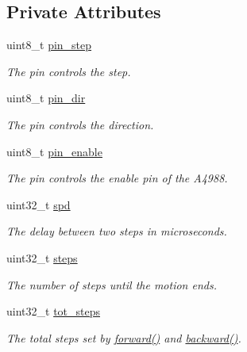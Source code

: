 \subsection*{Private Attributes}
\begin{DoxyCompactItemize}
\item 
uint8\+\_\+t \hyperlink{class_m_s_m_c___a4988_a2ea61398ce88d1ee627b409a5965b478}{pin\+\_\+step}
\begin{DoxyCompactList}\small\item\em The pin controls the step. \end{DoxyCompactList}\item 
uint8\+\_\+t \hyperlink{class_m_s_m_c___a4988_a2bc9676a272bcd6604aaf8b08ac07109}{pin\+\_\+dir}
\begin{DoxyCompactList}\small\item\em The pin controls the direction. \end{DoxyCompactList}\item 
uint8\+\_\+t \hyperlink{class_m_s_m_c___a4988_a822c3db98367f3e60347a13d1d16170b}{pin\+\_\+enable}
\begin{DoxyCompactList}\small\item\em The pin controls the enable pin of the A4988. \end{DoxyCompactList}\item 
uint32\+\_\+t \hyperlink{class_m_s_m_c___a4988_a6453efb52d22739962c05b0d03f65aa7}{spd}
\begin{DoxyCompactList}\small\item\em The delay between two steps in microseconds. \end{DoxyCompactList}\item 
uint32\+\_\+t \hyperlink{class_m_s_m_c___a4988_aa85fc95facc940db652cd2f545f033cd}{steps}
\begin{DoxyCompactList}\small\item\em The number of steps until the motion ends. \end{DoxyCompactList}\item 
uint32\+\_\+t \hyperlink{class_m_s_m_c___a4988_aa7de83eb15a9f82533b898146921939b}{tot\+\_\+steps}
\begin{DoxyCompactList}\small\item\em The total steps set by \hyperlink{class_m_s_m_c___a4988_a9acdbabf546656a6436e89579e8fcfca}{forward()} and \hyperlink{class_m_s_m_c___a4988_a836bed9e28e723ead2a94446bb704869}{backward()}. \end{DoxyCompactList}\item 

\end{DoxyCompactItemize}
